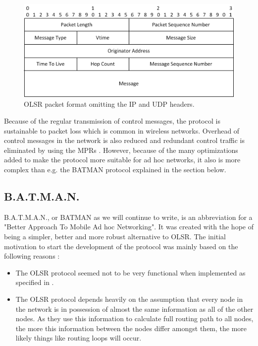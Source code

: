 \begin{figure}[ht]
	\centering
		\includegraphics{images/olsr.png}
	\caption{OLSR packet format omitting the IP and UDP headers.}
	\label{fig:olsr}
\end{figure}

\noindent
Because of the regular transmission of control messages, the protocol is sustainable to packet loss which is common in wireless networks. Overhead of control messages in the network is also reduced and redundant control traffic is eliminated by using the MPRs \cite{clausen2003rfc3626}. However, because of the many optimizations added to make the protocol more suitable for ad hoc networks, it also is more complex than e.g. the BATMAN protocol explained in the section below.

\subsection{B.A.T.M.A.N.}\label{batman}
B.A.T.M.A.N., or BATMAN as we will continue to write, is an abbreviation for a "Better Approach To Mobile Ad hoc Networking". It was created with the hope of being a simpler, better and more robust alternative to OLSR. The initial motivation to start the development of the protocol was mainly based on the following reasons \cite{open_mesh}:

\begin{itemize}
\item The OLSR protocol seemed not to be very functional when implemented as specified in \cite{clausen2003rfc3626}. %

\item The OLSR protocol depends heavily on the assumption that every node in the network is in possession of almost the same information as all of the other nodes. As they use this information to calculate full routing path to all nodes, the more this information between the nodes differ amongst them, the more likely things like routing loops will occur.
\end{itemize}

